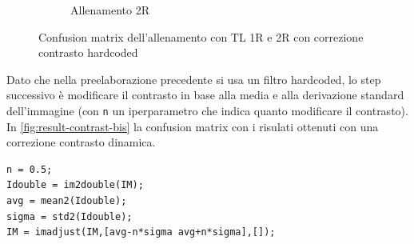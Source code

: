 \begin{figure}[H]
\begin{subfigure}{0.49\textwidth}
        \caption{Allenamento 2R} 
    \end{subfigure}
    \caption{Confusion matrix dell'allenamento con TL 1R e 2R con correzione contrasto hardcoded}
    \label{fig:result-contrast}
\end{figure}

Dato che nella preelaborazione precedente si usa un filtro hardcoded, lo step successivo è modificare il  contrasto in base alla media e alla derivazione standard dell'immagine (con \lstinline{n} un iperparametro che indica quanto modificare il contrasto). In \cref{fig:result-contrast-bis}  la confusion matrix con i risulati ottenuti con una correzione contrasto dinamica.
\begin{lstlisting}
n = 0.5;  
Idouble = im2double(IM); 
avg = mean2(Idouble);
sigma = std2(Idouble);
IM = imadjust(IM,[avg-n*sigma avg+n*sigma],[]);
\end{lstlisting}

